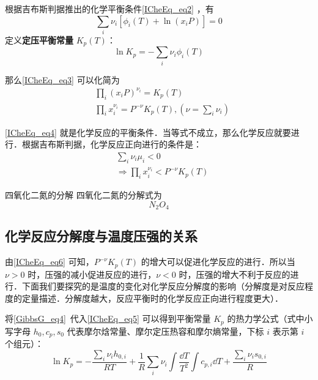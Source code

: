 根据吉布斯判据推出的化学平衡条件\autoref{ICheEq_eq2} ，有
\begin{equation}\label{ICheEq_eq3}
\sum_i\nu_i[\phi_i(T)+\ln (x_iP)]=0
\end{equation}
定义\textbf{定压平衡常量} $K_p(T)$：
\begin{equation}\label{ICheEq_eq5}
\ln K_p=-\sum_i\nu_i\phi_i(T)
\end{equation}

那么\autoref{ICheEq_eq3} 可以化简为
\begin{equation}\label{ICheEq_eq4}
\begin{aligned}
&\prod_i (x_iP)^{\nu_i}=K_p(T)\\
&\prod_i x_i^{\nu_i}=P^{-\nu} K_p(T),(\nu=\sum_i\nu_i)
\end{aligned}
\end{equation}

\autoref{ICheEq_eq4} 就是化学反应的平衡条件．当等式不成立，那么化学反应就要进行．根据吉布斯判据，化学反应正向进行的条件是：
\begin{equation}\label{ICheEq_eq6}
\begin{aligned}
&\sum_i \nu_i\mu_i<0\\
&\Rightarrow \prod_i x_i^{\nu_i}<P^{-\nu}K_p(T)
\end{aligned}
\end{equation}

\begin{example}{四氧化二氮的分解}
四氧化二氮的分解式为
\begin{equation}
N_2O_4
\end{equation}

\end{example}


\subsection{化学反应分解度与温度压强的关系}
由\autoref{ICheEq_eq6} 可知，$P^{-\nu}K_p(T)$ 的增大可以促进化学反应的进行．所以当 $\nu>0$ 时，压强的减小促进反应的进行，$\nu<0$ 时，压强的增大不利于反应的进行．下面我们要探究的是温度的变化对化学反应分解度的影响（分解度是对反应程度的定量描述．分解度越大，反应平衡时的化学反应正向进行程度更大）．

将\autoref{GibbsG_eq4}~代入\autoref{ICheEq_eq5} 可以得到平衡常量 $K_p$ 的热力学公式（式中小写字母 $h_0,c_p,s_0$ 代表摩尔焓常量、摩尔定压热容和摩尔熵常量，下标 $i$ 表示第 $i$ 个组元）：
\begin{equation}
\ln K_p=-\frac{\sum_i \nu_i h_{0,i}}{RT}+\frac{1}{R}\sum_i\nu_i\int \frac{\dd T}{T^2}\int c_{p,i}\dd T + \frac{\sum_i \nu_i s_{0,i}}{R}
\end{equation}

